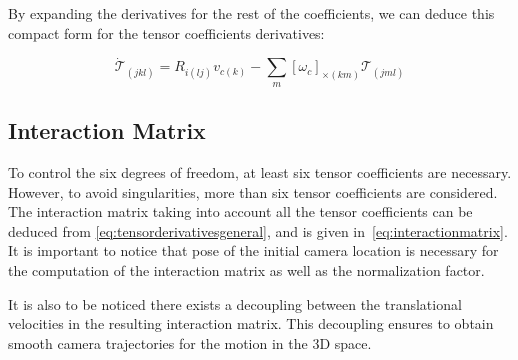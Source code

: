 By expanding the derivatives for the rest of the coefficients, we can deduce this compact form for the tensor coefficients derivatives:

\begin{equation}
  \dot{\mathcal{T}}_{(jkl)} = R_{i(lj)}v_{c(k)} - \sum_{m} {[\omega_{c}]}_{\times(km)} \mathcal{T}_{(jml)}
\label{eq:tensorderivativesgeneral}
\end{equation}

\subsection{Interaction Matrix} \label{sub:interaction_matrix}
To control the six degrees of freedom, at least six tensor coefficients are necessary. However, to avoid singularities, more than six tensor coefficients are considered. The interaction matrix taking into account all the tensor coefficients can be deduced from \eqref{eq:tensorderivativesgeneral}, and is given in~\eqref{eq:interactionmatrix}. It is important to notice that pose of the initial camera location is necessary for the computation of the interaction matrix as well as the normalization factor.

It is also to be noticed there exists a decoupling between the translational velocities in the resulting interaction matrix. This decoupling ensures to obtain smooth camera trajectories for the motion in the 3D space.

